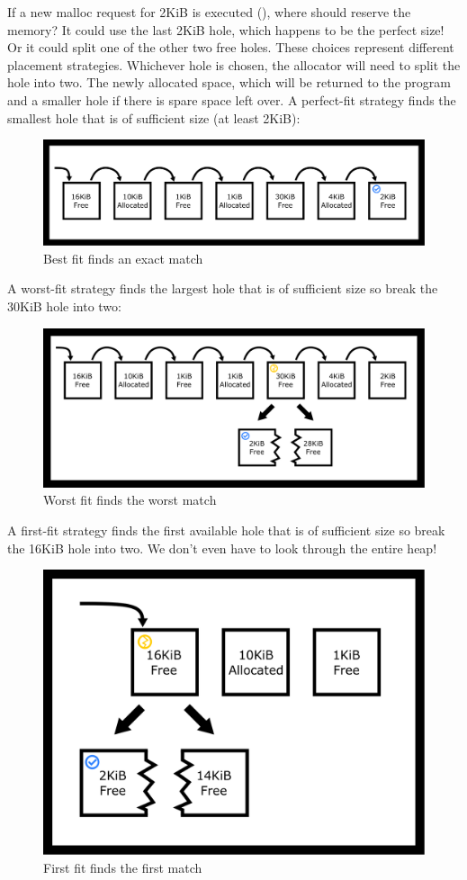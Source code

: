 If a new malloc request for 2KiB is executed (), where should  reserve the memory?
It could use the last 2KiB hole, which happens to be the perfect size!
Or it could split one of the other two free holes.
These choices represent different placement strategies.
Whichever hole is chosen, the allocator will need to split the hole into two.
The newly allocated space, which will be returned to the program and a smaller hole if there is spare space left over.
A perfect-fit strategy finds the smallest hole that is of sufficient size (at least 2KiB):

\begin{figure}[H]
\centering
\includegraphics[width=.9\textwidth]{malloc/drawings/heap_best_fit.png}
\caption{Best fit finds an exact match}
\end{figure}

A worst-fit strategy finds the largest hole that is of sufficient size so break the 30KiB hole into two:

\begin{figure}[H]
\centering
\includegraphics[width=.9\textwidth]{malloc/drawings/heap_worst_fit.png}
\caption{Worst fit finds the worst match}
\end{figure}


A first-fit strategy finds the first available hole that is of sufficient size so break the 16KiB hole into two.
We don't even have to look through the entire heap!

\begin{figure}[H]
\centering
\includegraphics[width=.5\textwidth]{malloc/drawings/heap_first_fit.png}
\caption{First fit finds the first match}
\end{figure}

